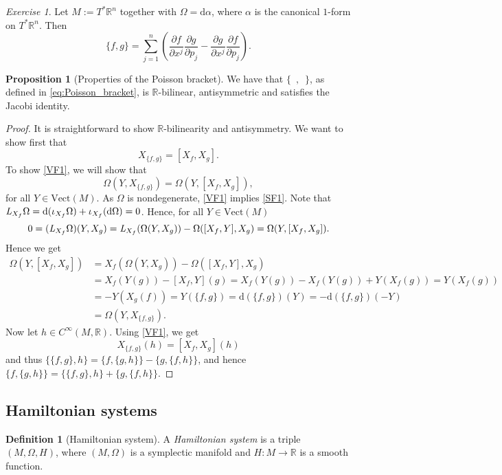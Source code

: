 \documentclass[12pt]{amsart}
\numberwithin{equation}{section}
\theoremstyle{plain}
\theoremstyle{definition}
\newtheorem{defn}{Definition}[subsection]
\newtheorem{prop}{Proposition}[subsection]
\theoremstyle{remark}
\newtheorem{exe}{Exercise}[subsection]
\newcommand{\R}{\mathbb{R}}
\newcommand{\dd}{{\mathrm{d}}}
\begin{document}
\begin{exe}
Let $M:=T^*\R^n$ together with $\Omega=\dd\alpha$, where $\alpha$ is the canonical $1$-form on $T^*\R^n$. Then 
\begin{equation}
\label{eq:Poisson_bracket}
\{f,g\}=\sum_{j=1}^n\left(\frac{\partial f}{\partial x^j}\frac{\partial g}{\partial p_j}-\frac{\partial g}{\partial x^j}\frac{\partial f}{\partial p_j}\right).
\end{equation}
\end{exe}

\begin{prop}[Properties of the Poisson bracket]
We have that $\{\enspace,\enspace\}$, as defined in \eqref{eq:Poisson_bracket}, is $\R$-bilinear, antisymmetric and satisfies the Jacobi identity.
\end{prop}

\begin{proof}
It is straightforward to show $\R$-bilinearity and antisymmetry. We want to show first that 
\begin{equation}
\label{VF1}
X_{\{f,g\}}=[X_f,X_g].
\end{equation}
To show \eqref{VF1}, we will show that 
\begin{equation}
\label{SF1}
\Omega(Y,X_{\{f,g\}})=\Omega(Y,[X_f,X_g]),
\end{equation}
for all $Y\in \mathrm{Vect}(M)$. As $\Omega$ is nondegenerate, \eqref{VF1} implies \eqref{SF1}. Note that $\emph{L}_{X_f}\Omega=\dd(\iota_{X_f}\Omega)+\iota_{X_f}(\dd\Omega)=0$. Hence, for all $Y\in \mathrm{Vect}(M)$
\[
0=(\emph{L}_{X_f}\Omega)(Y,X_g)=\emph{L}_{X_f}(\Omega(Y,X_g))-\Omega([X_f,Y],X_g)=\Omega(Y,[X_f,X_g]).
\]
Hence we get 
\begin{align*}
\Omega(Y,[X_f,X_g])&=X_f(\Omega(Y,X_g))-\Omega([X_f,Y],X_g)\\
&=X_f(Y(g))-[X_f,Y](g)=X_f(Y(g))-X_f(Y(g))+Y(X_f(g))=Y(X_f(g))\\
&=-Y(X_g(f))=Y(\{f,g\})=\dd(\{f,g\})(Y)=-\dd(\{f,g\})(-Y)\\
&=\Omega(Y,X_{\{f,g\}}).
\end{align*}
Now let $h\in C^\infty(M,\R)$. Using \eqref{VF1}, we get 
\[
X_{\{f,g\}}(h)=[X_f,X_g](h)
\]
and thus $\{\{f,g\},h\}=\{f,\{g,h\}\}-\{g,\{f,h\}\}$, and hence $\{f,\{g,h\}\}=\{\{f,g\},h\}+\{g,\{f,h\}\}$.
\end{proof}

\subsection{Hamiltonian systems}
\begin{defn}[Hamiltonian system]
A \emph{Hamiltonian system} is a triple $(M,\Omega, H)$, where $(M,\Omega)$ is a symplectic manifold and $H\colon M\to\R$ is a smooth function.
\end{defn}
\end{document}
